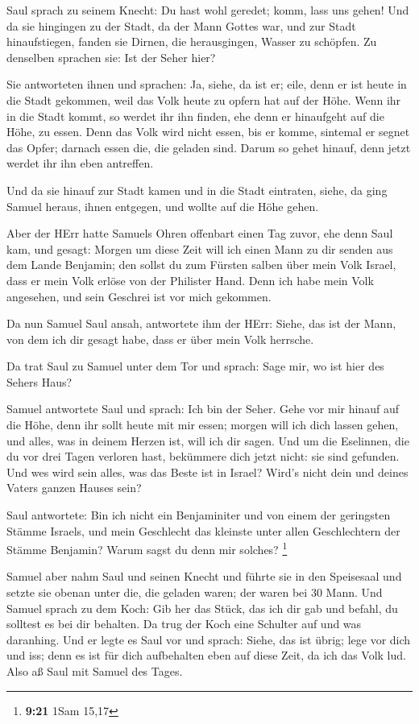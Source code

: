  Saul sprach zu seinem Knecht: Du hast wohl geredet; komm,
lass uns gehen! Und da sie hingingen zu der Stadt, da der Mann Gottes
war,  und zur Stadt hinaufstiegen, fanden sie Dirnen, die
herausgingen, Wasser zu schöpfen. Zu denselben sprachen sie: Ist der
Seher hier?

 Sie antworteten ihnen und sprachen: Ja, siehe, da ist er;
eile, denn er ist heute in die Stadt gekommen, weil das Volk heute zu
opfern hat auf der Höhe.  Wenn ihr in die Stadt kommt, so
werdet ihr ihn finden, ehe denn er hinaufgeht auf die Höhe, zu essen.
Denn das Volk wird nicht essen, bis er komme, sintemal er segnet das
Opfer; darnach essen die, die geladen sind. Darum so gehet hinauf, denn
jetzt werdet ihr ihn eben antreffen.

 Und da sie hinauf zur Stadt kamen und in die Stadt
eintraten, siehe, da ging Samuel heraus, ihnen entgegen, und wollte auf
die Höhe gehen.

 Aber der HErr hatte Samuels Ohren offenbart einen Tag
zuvor, ehe denn Saul kam, und gesagt:  Morgen um diese Zeit
will ich einen Mann zu dir senden aus dem Lande Benjamin; den sollst du
zum Fürsten salben über mein Volk Israel, dass er mein Volk erlöse von
der Philister Hand. Denn ich habe mein Volk angesehen, und sein Geschrei
ist vor mich gekommen.

 Da nun Samuel Saul ansah, antwortete ihm der HErr: Siehe,
das ist der Mann, von dem ich dir gesagt habe, dass er über mein Volk
herrsche.

 Da trat Saul zu Samuel unter dem Tor und sprach: Sage mir,
wo ist hier des Sehers Haus?

 Samuel antwortete Saul und sprach: Ich bin der Seher. Gehe
vor mir hinauf auf die Höhe, denn ihr sollt heute mit mir essen; morgen
will ich dich lassen gehen, und alles, was in deinem Herzen ist, will
ich dir sagen.  Und um die Eselinnen, die du vor drei Tagen
verloren hast, bekümmere dich jetzt nicht: sie sind gefunden. Und wes
wird sein alles, was das Beste ist in Israel? Wird's nicht dein und
deines Vaters ganzen Hauses sein?

 Saul antwortete: Bin ich nicht ein Benjaminiter und von
einem der geringsten Stämme Israels, und mein Geschlecht das kleinste
unter allen Geschlechtern der Stämme Benjamin? Warum sagst du denn mir
solches? \footnote{\textbf{9:21} 1Sam 15,17}

 Samuel aber nahm Saul und seinen Knecht und führte sie in
den Speisesaal und setzte sie obenan unter die, die geladen waren; der
waren bei 30 Mann.  Und Samuel sprach zu dem Koch: Gib her
das Stück, das ich dir gab und befahl, du solltest es bei dir behalten.
 Da trug der Koch eine Schulter auf und was daranhing. Und
er legte es Saul vor und sprach: Siehe, das ist übrig; lege vor dich und
iss; denn es ist für dich aufbehalten eben auf diese Zeit, da ich das
Volk lud. Also aß Saul mit Samuel des Tages.

